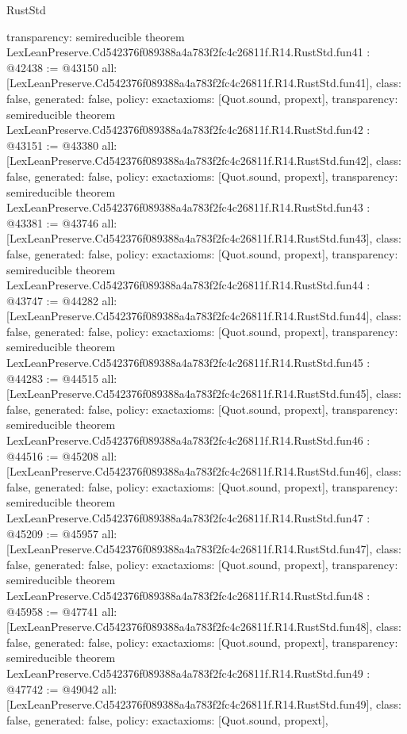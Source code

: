 \begin{lexlean}{RustStd}
\begin{coremodule}
{  transparency: semireducible
}
theorem LexLeanPreserve.Cd542376f089388a4a783f2fc4c26811f.R14.RustStd.fun41 : @42438 := @43150 {
  all: [LexLeanPreserve.Cd542376f089388a4a783f2fc4c26811f.R14.RustStd.fun41],
  class: false,
  generated: false,
  policy: exact{axioms: [Quot.sound, propext]},
  transparency: semireducible
}
theorem LexLeanPreserve.Cd542376f089388a4a783f2fc4c26811f.R14.RustStd.fun42 : @43151 := @43380 {
  all: [LexLeanPreserve.Cd542376f089388a4a783f2fc4c26811f.R14.RustStd.fun42],
  class: false,
  generated: false,
  policy: exact{axioms: [Quot.sound, propext]},
  transparency: semireducible
}
theorem LexLeanPreserve.Cd542376f089388a4a783f2fc4c26811f.R14.RustStd.fun43 : @43381 := @43746 {
  all: [LexLeanPreserve.Cd542376f089388a4a783f2fc4c26811f.R14.RustStd.fun43],
  class: false,
  generated: false,
  policy: exact{axioms: [Quot.sound, propext]},
  transparency: semireducible
}
theorem LexLeanPreserve.Cd542376f089388a4a783f2fc4c26811f.R14.RustStd.fun44 : @43747 := @44282 {
  all: [LexLeanPreserve.Cd542376f089388a4a783f2fc4c26811f.R14.RustStd.fun44],
  class: false,
  generated: false,
  policy: exact{axioms: [Quot.sound, propext]},
  transparency: semireducible
}
theorem LexLeanPreserve.Cd542376f089388a4a783f2fc4c26811f.R14.RustStd.fun45 : @44283 := @44515 {
  all: [LexLeanPreserve.Cd542376f089388a4a783f2fc4c26811f.R14.RustStd.fun45],
  class: false,
  generated: false,
  policy: exact{axioms: [Quot.sound, propext]},
  transparency: semireducible
}
theorem LexLeanPreserve.Cd542376f089388a4a783f2fc4c26811f.R14.RustStd.fun46 : @44516 := @45208 {
  all: [LexLeanPreserve.Cd542376f089388a4a783f2fc4c26811f.R14.RustStd.fun46],
  class: false,
  generated: false,
  policy: exact{axioms: [Quot.sound, propext]},
  transparency: semireducible
}
theorem LexLeanPreserve.Cd542376f089388a4a783f2fc4c26811f.R14.RustStd.fun47 : @45209 := @45957 {
  all: [LexLeanPreserve.Cd542376f089388a4a783f2fc4c26811f.R14.RustStd.fun47],
  class: false,
  generated: false,
  policy: exact{axioms: [Quot.sound, propext]},
  transparency: semireducible
}
theorem LexLeanPreserve.Cd542376f089388a4a783f2fc4c26811f.R14.RustStd.fun48 : @45958 := @47741 {
  all: [LexLeanPreserve.Cd542376f089388a4a783f2fc4c26811f.R14.RustStd.fun48],
  class: false,
  generated: false,
  policy: exact{axioms: [Quot.sound, propext]},
  transparency: semireducible
}
theorem LexLeanPreserve.Cd542376f089388a4a783f2fc4c26811f.R14.RustStd.fun49 : @47742 := @49042 {
  all: [LexLeanPreserve.Cd542376f089388a4a783f2fc4c26811f.R14.RustStd.fun49],
  class: false,
  generated: false,
  policy: exact{axioms: [Quot.sound, propext]},
}
\end{coremodule}
\end{lexlean}
